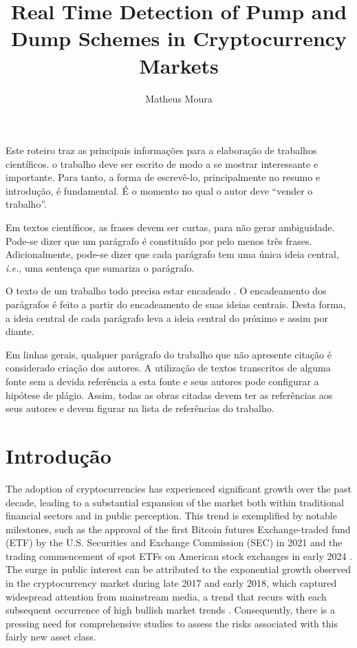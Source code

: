 \documentclass[12pt]{article}
\title{Real Time Detection of Pump and Dump Schemes in Cryptocurrency Markets}
\author{Matheus Moura\inst{1}}
\begin{document}
 
	
	\maketitle
	
	\begin{resumo} 
		Este roteiro traz as principais informações para a elaboração de trabalhos científicos. o trabalho deve ser escrito de modo a se mostrar interessante e importante. Para tanto, a forma de escrevê-lo, principalmente no resumo e  introdução, é fundamental. É o momento no qual o autor deve ``vender o trabalho''. 
		
		Em textos científicos, as frases devem ser curtas, para não gerar ambiguidade. Pode-se dizer que um parágrafo é constituído por pelo menos três frases. Adicionalmente, pode-se dizer que cada parágrafo tem uma única ideia central, \emph{i.e.}, uma sentença  que sumariza o parágrafo. 
		
		O texto de um trabalho todo precisa estar encadeado \citep{zobel_writing_2015}. O encadeamento dos parágrafos é feito a partir do encadeamento de suas ideias centrais. Desta forma, a ideia central de cada parágrafo leva a ideia central do próximo e assim por diante. 
		
		Em linhas gerais, qualquer parágrafo do trabalho que não apresente citação é considerado criação dos autores. A utilização de textos transcritos de alguma fonte sem a devida referência a esta fonte e seus autores pode configurar a hipótese de plágio. Assim, todas as obras citadas devem ter as referências aos seus autores e devem figurar na lista de referências do trabalho.
	\end{resumo}
	
	\section{Introdução}
	\label{sec_introducao}

	The adoption of cryptocurrencies has experienced significant growth over the past decade, leading to a substantial expansion of the market both within traditional financial sectors and in public perception.
	This trend is exemplified by notable milestones, such as the approval of the first Bitcoin futures Exchange-traded fund (ETF) by the U.S. Securities and Exchange Commission (SEC) in 2021 \citep{wursthorn2021} and the trading commencement of spot ETFs on American stock exchanges in early 2024 \citep{schmitt2024}.
	The surge in public interest can be attributed to the exponential growth observed in the cryptocurrency market during late 2017 and early 2018, which captured widespread attention from mainstream media, a trend that recurs with each subsequent occurrence of high bullish market trends \citep{steinmetz2021}.
	Consequently, there is a pressing need for comprehensive studies to assess the risks associated with this fairly new asset class.
	
\end{document}
